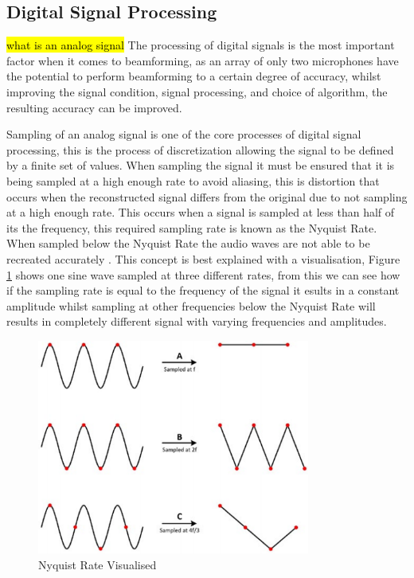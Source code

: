 \documentclass{UoNMCHA}
\numberwithin{equation}{section}
\begin{document}
\subsection{Digital Signal Processing} \label{sec:Signal Processing}
    \hl{what is an analog signal}
    The processing of digital signals is the most important factor when it comes to beamforming, as an array of only two microphones have the potential to perform beamforming to a certain degree of accuracy, whilst improving the signal condition, signal processing, and choice of algorithm, the resulting accuracy can be improved.
    
    Sampling of an analog signal is one of the core processes of digital signal processing, this is the process of discretization allowing the signal to be defined by a finite set of values. When sampling the signal it must be ensured that it is being sampled at a high enough rate to avoid aliasing, this is distortion that occurs when the reconstructed signal differs from the original due to not sampling at a high enough rate. This occurs when a signal is sampled at less than half of its the frequency, this required sampling rate is known as the Nyquist Rate. When sampled below the Nyquist Rate the audio waves are not able to be recreated accurately \citep{Ben08}. This concept is best explained with a visualisation, Figure \ref{fig:NyquistFrequency} shows one sine wave sampled at three different rates, from this we can see how if the sampling rate is equal to the frequency of the signal it esults in a constant amplitude whilst sampling at other frequencies below the Nyquist Rate will results in completely different signal with varying frequencies and amplitudes. 

    \begin{figure}[H]
        \centering
        \includegraphics[keepaspectratio, width = 0.8\textwidth]{Figures/NyquistFrequency.png}
        \caption{Nyquist Rate Visualised \citep{NINyq}}
        \label{fig:NyquistFrequency}
    \end{figure}
    
\end{document}
